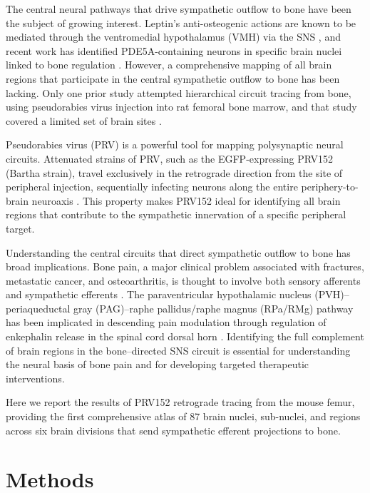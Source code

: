 \documentclass[12pt]{article}
\begin{document}
The central neural pathways that drive sympathetic outflow to bone have been the subject of growing interest. Leptin's anti-osteogenic actions are known to be mediated through the ventromedial hypothalamus (VMH) via the SNS \citep{ducy2000, takeda2002}, and recent work has identified PDE5A-containing neurons in specific brain nuclei linked to bone regulation \citep{huang2020}. However, a comprehensive mapping of all brain regions that participate in the central sympathetic outflow to bone has been lacking. Only one prior study attempted hierarchical circuit tracing from bone, using pseudorabies virus injection into rat femoral bone marrow, and that study covered a limited set of brain sites \citep{zhang2020}.

Pseudorabies virus (PRV) is a powerful tool for mapping polysynaptic neural circuits. Attenuated strains of PRV, such as the EGFP-expressing PRV152 (Bartha strain), travel exclusively in the retrograde direction from the site of peripheral injection, sequentially infecting neurons along the entire periphery-to-brain neuroaxis \citep{card2011, enquist2002}. This property makes PRV152 ideal for identifying all brain regions that contribute to the sympathetic innervation of a specific peripheral target.

Understanding the central circuits that direct sympathetic outflow to bone has broad implications. Bone pain, a major clinical problem associated with fractures, metastatic cancer, and osteoarthritis, is thought to involve both sensory afferents and sympathetic efferents \citep{mantyh2014}. The paraventricular hypothalamic nucleus (PVH)--periaqueductal gray (PAG)--raphe pallidus/raphe magnus (RPa/RMg) pathway has been implicated in descending pain modulation through regulation of enkephalin release in the spinal cord dorsal horn \citep{fields2004}. Identifying the full complement of brain regions in the bone--directed SNS circuit is essential for understanding the neural basis of bone pain and for developing targeted therapeutic interventions.

Here we report the results of PRV152 retrograde tracing from the mouse femur, providing the first comprehensive atlas of 87 brain nuclei, sub-nuclei, and regions across six brain divisions that send sympathetic efferent projections to bone.

\section{Methods}
\end{document}

